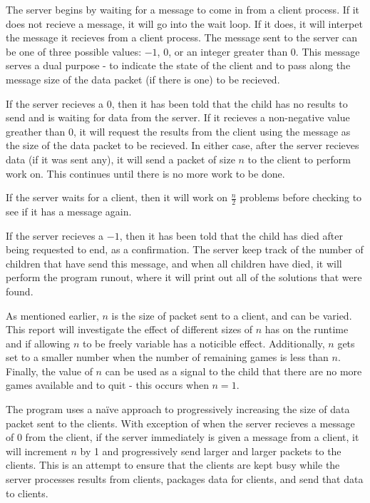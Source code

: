 \documentclass{article}
\begin{document}
  The server begins by waiting for a message to come in from a client process.
  If it does not recieve a message, it will go into the wait loop. If it does,
  it will interpet the message it recieves from a client process. The message
  sent to the server can be one of three possible values: \(-1\), \(0\), or an
  integer greater than \(0\). This message serves a dual purpose - to indicate
  the state of the client and to pass along the message size of the data packet
  (if there is one) to be recieved.

  If the server recieves a \(0\), then it has been told that the child has no
  results to send and is waiting for data from the server. If it recieves a
  non-negative value greather than \(0\), it will request the results from the
  client using the message as the size of the data packet to be recieved. In 
  either case, after the server recieves data (if it was sent any),  it will 
  send a packet of size \(n\) to the client to perform work on. This continues
  until there is no more work to be done.

  If the server waits for a client, then it will work on \(\frac{n}{2}\) problems
  before checking to see if it has a message again.

  If the server recieves a \(-1\), then it has been told that the child has
  died after being requested to end, as a confirmation. The server keep track
  of the number of children that have send this message, and when all children
  have died, it will perform the program runout, where it will print out all
  of the solutions that were found.

  As mentioned earlier, \(n\) is the size of packet sent to a client, and can
  be varied. This report will investigate the effect of different sizes of 
  \(n\) has on the runtime and if allowing \(n\) to be freely variable has a
  noticible effect. Additionally, \(n\) gets set to a smaller number when the
  number of remaining games is less than \(n\). Finally, the value of \(n\) can
  be used as a signal to the child that there are no more games available and
  to quit - this occurs when \(n=1\).

  The program uses a na\"{i}ve approach to progressively increasing the size of
  data packet sent to the clients. With exception of when the server recieves a
  message of \(0\) from the client, if the server immediately is given a
  message from a client, it will increment \(n\) by 1 and progressively send
  larger and larger packets to the clients. This is an attempt to ensure that
  the clients are kept busy while the server processes results from clients,
  packages data for clients, and send that data to clients.
\end{document}
